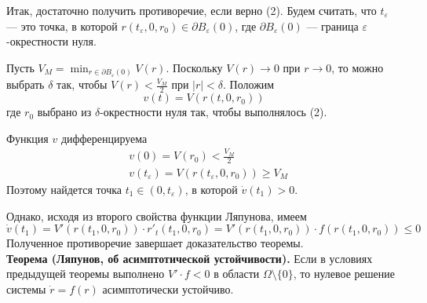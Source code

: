 Итак, достаточно получить противоречие, если верно (2). Будем считать, что $t_{\varepsilon}$ --- это точка, в которой $r(t_{\varepsilon}, 0, r_0) \in \partial B_{\varepsilon}(0)$, где $\partial B_{\varepsilon}(0)$ --- граница $\varepsilon$-окрестности нуля.

Пусть $V_M = \displaystyle\min_{r \in \partial B_{\varepsilon}(0)}V(r)$. Поскольку $V(r) \to 0$ при $r \to 0$, то можно выбрать $\delta$ так, чтобы $V(r) < \frac{V_M}{2}$ при $|r| < \delta$. Положим
\begin{equation*}
    v(t) = V(r(t, 0, r_0))
\end{equation*}
где $r_0$ выбрано из $\delta$-окрестности нуля так, чтобы выполнялось (2).

Функция $v$ дифференцируема
\begin{equation*}
    \begin{aligned}
        &v(0) = V(r_0) < \frac{V_M}{2}\\
        &v(t_{\varepsilon}) = V(r(t_{\varepsilon}, 0, r_0)) \ge V_M
    \end{aligned}
\end{equation*}
Поэтому найдется точка $t_1 \in (0, t_{\varepsilon})$, в которой $\dot{v}(t_1) > 0$.

Однако, исходя из второго свойства функции Ляпунова, имеем
\begin{equation*}
    \dot{v}(t_1) = V'(r(t_1, 0, r_0))\cdot r'_t(t_1, 0, r_0) = V'(r(t_1, 0, r_0)) \cdot f(r(t_1, 0, r_0)) \le 0
\end{equation*}
Полученное противоречие завершает доказательство теоремы.\\

\noindent \textbf{Теорема (Ляпунов, об асимптотической устойчивости).} Если в условиях предыдущей теоремы выполнено $V' \cdot f < 0$ в области $\Omega \setminus \{0\}$, то нулевое решение системы $\dot{r} = f(r)$ асимптотически устойчиво.
